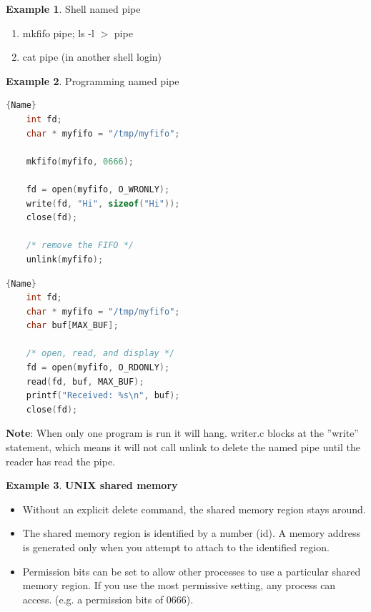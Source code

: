 \documentclass[12pt,a4paper]{article}
\theoremstyle{definition}
\newtheorem{example}{Example}[section]
\newenvironment{myitemize}
{ \begin{itemize}
    \setlength{\itemsep}{5pt}
    \setlength{\parskip}{0pt}
    \setlength{\parsep}{0pt}     }
{ \end{itemize}                  }
\newenvironment{myenumerate}
{ \begin{enumerate}
    \setlength{\itemsep}{5pt}
    \setlength{\parskip}{0pt}
    \setlength{\parsep}{0pt}     }
{ \end{enumerate}                }
\begin{document}
\begin{example}{Shell named pipe}
	\begin{myenumerate}
		\item \textsf{mkfifo pipe; ls -l $>$ pipe}
		\item \textsf{cat pipe} (in another shell login)
	\end{myenumerate}
\end{example}

\begin{example}{Programming named pipe}

\noindent\begin{minipage}{.48\textwidth}
\begin{lstlisting}[caption=writer.c,frame=tlrb,language=C]{Name}
    int fd;
    char * myfifo = "/tmp/myfifo";

    mkfifo(myfifo, 0666);

    fd = open(myfifo, O_WRONLY);
    write(fd, "Hi", sizeof("Hi"));
    close(fd);

    /* remove the FIFO */
    unlink(myfifo);
\end{lstlisting}
\end{minipage}\hfill
\begin{minipage}{.48\textwidth}
\begin{lstlisting}[caption=reader.c,frame=tlrb,language=C]{Name}
    int fd;
    char * myfifo = "/tmp/myfifo";
    char buf[MAX_BUF];

    /* open, read, and display */
    fd = open(myfifo, O_RDONLY);
    read(fd, buf, MAX_BUF);
    printf("Received: %s\n", buf);
    close(fd);

\end{lstlisting}
\end{minipage}
\textbf{Note}: When only one program is run it will hang. writer.c blocks at the ''write'' statement, which means it will not call unlink to delete the named pipe until the reader has read the pipe.

\end{example}

\begin{example}{\textbf{UNIX shared memory}}
	\begin{myitemize}
		\item Without an explicit delete command, the shared memory region stays around.
		\item The shared memory region is identified by a number (id). A memory address is generated only when you attempt to attach to the identified region.
		\item Permission bits can be set to allow other processes to use a particular shared memory region. If you use the most permissive setting, any process can access. (e.g. a permission bits of 0666).
	\end{myitemize}
\end{example}
\end{document}
